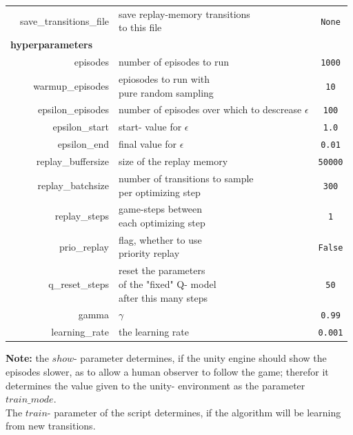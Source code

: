 \documentclass{article}
\begin{document}
\begin{tabular}{ |l|r|l|c| }
               & save\_transitions\_file & \makecell[tl]{save replay-memory transitions \\ to this file} & \texttt{None} \\
\multicolumn{4}{|l|}{\textbf{hyperparameters}} \\
               & episodes & number of episodes to run & \texttt{1000} \\
               & warmup\_episodes & \makecell[tl]{epiosodes to run with \\ pure random sampling} & \texttt{10} \\
               & epsilon\_episodes & \makecell[tl]{number of episodes over \\ which to descrease $\epsilon$} & \texttt{100} \\
               & epsilon\_start & start- value for $\epsilon$ & \texttt{1.0} \\
               & epsilon\_end & final value for $\epsilon$ & \texttt{0.01} \\
               & replay\_buffersize & size of the replay memory & \texttt{50000} \\
               & replay\_batchsize & \makecell[tl]{number of transitions to sample \\ per optimizing step} & \texttt{300} \\
               & replay\_steps & \makecell[tl]{game-steps between \\ each optimizing step} & \texttt{1} \\
               & prio\_replay & \makecell[tl]{flag, whether to use \\ priority replay} & \texttt{False} \\
               & q\_reset\_steps & \makecell[tl]{reset the parameters \\ of the "fixed" Q- model \\ after this many steps} & \texttt{50} \\
               & gamma & $\gamma$ & \texttt{0.99} \\
               & learning\_rate & the learning rate & \texttt{0.001} \\
\hline
\end{tabular}
\textbf{Note:} the $show$- parameter determines, if the unity engine should
show the episodes slower, as to allow a human observer to follow the game; therefor
it determines the value given to the unity- environment as the parameter $train\_mode$.
\\
The $train$- parameter of the script determines, if the algorithm will be learning
from new transitions.
\end{document}
